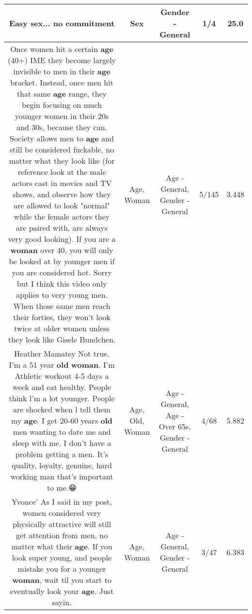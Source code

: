 \documentclass[11pt]{article}
\newlength\mylength
\begin{document}
\begin{center}
\begin{longtable}{|C{.65\mylength}|C{.30\mylength}|C{.12\mylength}|C{.12\mylength}|C{.12\mylength}|}
  \small Easy \textbf{sex}... no commitment\normalsize   & Sex & Gender - General & 1/4 & 25.0 \\  \hline
  \small Once women hit a certain \textbf{age} (40+) IME they become largely invisible to men in their \textbf{age} bracket. Instead, once men hit that same \textbf{age} range, they begin focusing on much younger women in their 20s and 30s, because they can. Society allows men to \textbf{age} and still be considered fuckable, no matter what they look like (for reference look at the male actors cast in movies and TV shows, and observe how they are allowed to look "normal" while the female actors they are paired with, are always very good looking). If you are a \textbf{woman} over 40, you will only be looked at by younger men if you are considered hot. Sorry but I think this video only applies to very young men. When those same men reach their forties, they won't look twice at older women unless they look like Gisele Bundchen.\normalsize   & Age, Woman & Age - General, Gender - General & 5/145 & 3.448 \\  \hline
  \small Heather Mamatey Not true. I'm a 51 year \textbf{old} \textbf{woman}. I'm Athletic workout 4-5 days a week and eat healthy. People think l'm a lot younger. People are shocked when l tell them my \textbf{age}. I get 20-60 years \textbf{old} men wanting to date me and sleep with me. I don't have a problem getting a men. It's quality, loyalty, genuine, hard working man that's important to me.😁\normalsize   & Age, Old, Woman & Age - General, Age - Over 65s, Gender - General & 4/68 & 5.882 \\  \hline
  \small Yvonce' As I said in my post, women considered very physically attractive will still get attention from men, no matter what their \textbf{age}. If you look super young, and people mistake you for a younger \textbf{woman}, wait til you start to eventually look your \textbf{age}. Just sayin.\normalsize   & Age, Woman & Age - General, Gender - General & 3/47 & 6.383 \\  \hline

\end{longtable}
\end{center}
\end{document}
